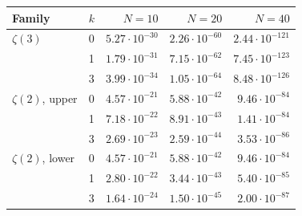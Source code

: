 \begin{tabular}{llrrr}
\toprule
Family & $k$ & $N=10$ & $N=20$ & $N=40$ \\
\midrule
$\zeta(3)$ & 0 & $5.27\cdot10^{-30}$ & $2.26\cdot10^{-60}$ & $2.44\cdot10^{-121}$ \\
 & 1 & $1.79\cdot10^{-31}$ & $7.15\cdot10^{-62}$ & $7.45\cdot10^{-123}$ \\
 & 3 & $3.99\cdot10^{-34}$ & $1.05\cdot10^{-64}$ & $8.48\cdot10^{-126}$ \\
\addlinespace
$\zeta(2)$, upper & 0 & $4.57\cdot10^{-21}$ & $5.88\cdot10^{-42}$ & $9.46\cdot10^{-84}$ \\
 & 1 & $7.18\cdot10^{-22}$ & $8.91\cdot10^{-43}$ & $1.41\cdot10^{-84}$ \\
 & 3 & $2.69\cdot10^{-23}$ & $2.59\cdot10^{-44}$ & $3.53\cdot10^{-86}$ \\
\addlinespace
$\zeta(2)$, lower & 0 & $4.57\cdot10^{-21}$ & $5.88\cdot10^{-42}$ & $9.46\cdot10^{-84}$ \\
 & 1 & $2.80\cdot10^{-22}$ & $3.44\cdot10^{-43}$ & $5.40\cdot10^{-85}$ \\
 & 3 & $1.64\cdot10^{-24}$ & $1.50\cdot10^{-45}$ & $2.00\cdot10^{-87}$ \\
\bottomrule
\end{tabular}
